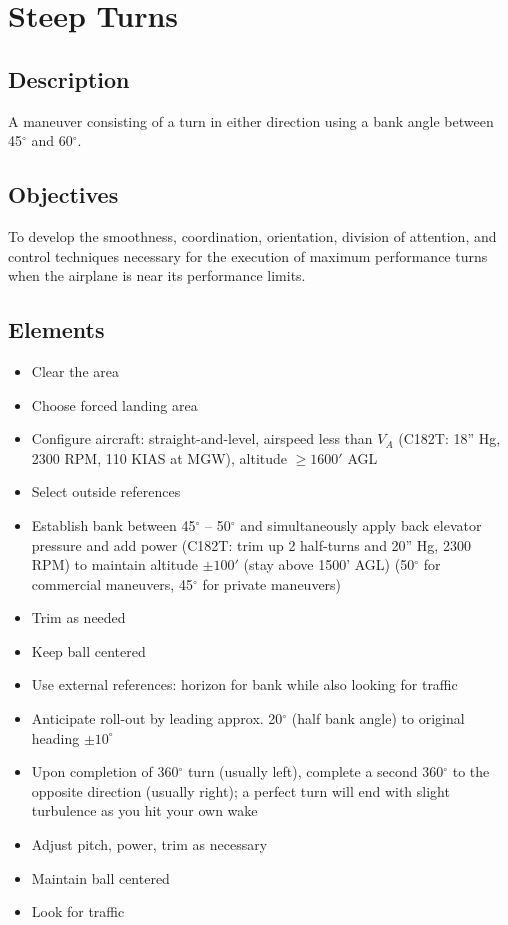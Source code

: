 \section{Steep Turns}

\subsection{Description}

A maneuver consisting of a turn in either direction using a bank angle between
45$^\circ$ and 60$^\circ$.

\subsection{Objectives}

To develop the smoothness, coordination, orientation, division of attention,
and control techniques necessary for the execution of maximum performance turns
when the airplane is near its performance limits.

\subsection{Elements}

\begin{itemize}
  \item Clear the area
  \item Choose forced landing area
  \item Configure aircraft: straight-and-level, airspeed less than $V_A$
    (C182T: 18'' Hg, 2300 RPM, 110 KIAS at MGW), altitude $\geq 1600'$ AGL 
  \item Select outside references
  \item Establish bank between 45$^\circ$ – 50$^\circ$ and simultaneously apply
    back elevator pressure and add power (C182T: trim up 2 half-turns and 20''
    Hg, 2300 RPM) to maintain altitude $\pm 100'$ (stay above 1500' AGL)
    (50$^\circ$ for commercial maneuvers, 45$^\circ$ for private maneuvers)
  \item Trim as needed
  \item Keep ball centered
  \item Use external references: horizon for bank while also looking for
    traffic
  \item Anticipate roll-out by leading approx. 20$^\circ$ (half bank angle) to
    original heading $\pm 10^\circ$
  \item Upon completion of 360$^\circ$ turn (usually left), complete a second
    360$^\circ$ to the opposite direction (usually right); a perfect turn will
    end with slight turbulence as you hit your own wake
  \item Adjust pitch, power, trim as necessary
  \item Maintain ball centered 
  \item Look for traffic
\end{itemize}

